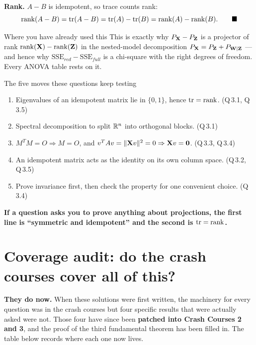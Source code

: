 \documentclass[11pt]{article}
\newcounter{qq}[section]
\begin{document}
\textbf{Rank.} $A-B$ is idempotent, so trace counts rank:
\[
  \operatorname{rank}(A-B)=\operatorname{tr}(A-B)=\operatorname{tr}(A)-\operatorname{tr}(B)=\operatorname{rank}(A)-\operatorname{rank}(B). \qquad\blacksquare
\]

\begin{idea}{Where you have already used this}
This is exactly why $P_{\mathbf{X}}-P_{\mathbf{Z}}$ is a projector of rank $\operatorname{rank}(\mathbf{X})-\operatorname{rank}(\mathbf{Z})$ in the
nested-model decomposition $P_{\mathbf{X}}=P_{\mathbf{Z}}+P_{\mathbf{W}\mid\mathbf{Z}}$ --- and hence why
$\mathrm{SSE}_{red}-\mathrm{SSE}_{full}$ is a chi-square with the right degrees of freedom.
Every ANOVA table rests on it.
\end{idea}

\begin{recipe}{The five moves these questions keep testing}
\begin{enumerate}
  \item Eigenvalues of an idempotent matrix lie in $\{0,1\}$, hence $\operatorname{tr}=\operatorname{rank}$.
        \hfill(Q\,3.1, Q\,3.5)
  \item Spectral decomposition to split $\mathbb{R}^n$ into orthogonal blocks. \hfill(Q\,3.1)
  \item $M^TM=O\Rightarrow M=O$, and $v^TA v=\|\mathbf{X} v\|^2=0\Rightarrow \mathbf{X} v=\mathbf{0}$.
        \hfill(Q\,3.3, Q\,3.4)
  \item An idempotent matrix acts as the identity on its own column space.
        \hfill(Q\,3.2, Q\,3.5)
  \item Prove invariance first, then check the property for one convenient choice.
        \hfill(Q\,3.4)
\end{enumerate}
\textbf{If a question asks you to prove anything about projections, the first line is
``symmetric and idempotent'' and the second is $\operatorname{tr}=\operatorname{rank}$.}
\end{recipe}

\section{Coverage audit: do the crash courses cover all of this?}

\textbf{They do now.} When these solutions were first written, the machinery for every
question was in the crash courses but four specific results that were actually asked were
not. Those four have since been \textbf{patched into Crash Courses 2 and 3}, and the proof of
the third fundamental theorem has been filled in. The table below records where each one now
lives.
\end{document}
